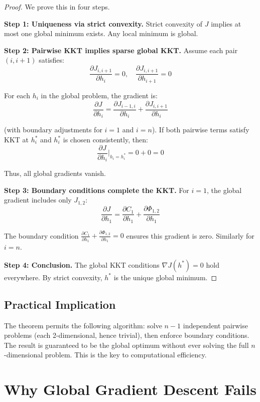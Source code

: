 \documentclass[12pt]{article}
\theoremstyle{definition}
\begin{document}
\begin{proof}
We prove this in four steps.

\noindent\textbf{Step 1: Uniqueness via strict convexity.}
Strict convexity of $J$ implies at most one global minimum exists. Any local minimum is global.

\noindent\textbf{Step 2: Pairwise KKT implies sparse global KKT.}
Assume each pair $(i, i+1)$ satisfies:
\[
\frac{\partial J_{i,i+1}}{\partial h_i} = 0, \quad \frac{\partial J_{i,i+1}}{\partial h_{i+1}} = 0
\]

For each $h_i$ in the global problem, the gradient is:
\[
\frac{\partial J}{\partial h_i} = \frac{\partial J_{i-1,i}}{\partial h_i} + \frac{\partial J_{i,i+1}}{\partial h_i}
\]

(with boundary adjustments for $i=1$ and $i=n$). If both pairwise terms satisfy KKT at $h_i^*$ and $h_i^*$ is chosen consistently, then:
\[
\frac{\partial J}{\partial h_i}\bigg|_{h_i=h_i^*} = 0 + 0 = 0
\]

Thus, all global gradients vanish.

\noindent\textbf{Step 3: Boundary conditions complete the KKT.}
For $i=1$, the global gradient includes only $J_{1,2}$:
\[
\frac{\partial J}{\partial h_1} = \frac{\partial C_1}{\partial h_1} + \frac{\partial \Phi_{1,2}}{\partial h_1}
\]

The boundary condition $\frac{\partial C_1}{\partial h_1} + \frac{\partial \Phi_{1,2}}{\partial h_1} = 0$ ensures this gradient is zero. Similarly for $i=n$.

\noindent\textbf{Step 4: Conclusion.}
The global KKT conditions $\nabla J(h^*) = 0$ hold everywhere. By strict convexity, $h^*$ is the unique global minimum.
\end{proof}

\subsection{Practical Implication}

The theorem permits the following algorithm: solve $n-1$ independent pairwise problems (each 2-dimensional, hence trivial), then enforce boundary conditions. The result is guaranteed to be the global optimum without ever solving the full $n$-dimensional problem. This is the key to computational efficiency.

\section{Why Global Gradient Descent Fails}
\end{document}
